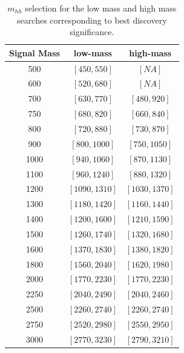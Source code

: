 \begin{table}
\label{tab:mhh_sig_cuts}
\begin{center}
\begin{tabular}{c|c|c}
  Signal Mass & low-mass & high-mass\\
\hline
500 & $[ 450, 550] $   & $[ NA ] $ \\
600 & $[ 520, 680] $ & $[ NA ] $\\ 
700 & $[ 630, 770] $ & $[ 480, 920 ] $\\ 
750 & $[ 680, 820] $ & $[ 660, 840] $\\ 
800 & $[ 720, 880] $ & $[ 730, 870] $\\ 
900 & $[ 800, 1000] $ & $[ 750, 1050] $\\ 
1000 & $[ 940, 1060] $ & $[ 870, 1130] $\\ 
1100 & $[ 960, 1240] $ & $[ 880, 1320] $\\ 
1200 & $[ 1090, 1310] $ & $[ 1030, 1370] $\\ 
1300 & $[ 1180, 1420] $ & $[ 1160, 1440] $\\ 
1400 & $[ 1200, 1600] $ & $[ 1210, 1590] $\\ 
1500 & $[ 1260, 1740] $ & $[ 1320, 1680] $\\ 
1600 & $[ 1370, 1830] $ & $[ 1380, 1820] $\\ 
1800 & $[ 1560, 2040] $ & $[ 1620, 1980] $\\ 
2000 & $[ 1770, 2230] $ & $[ 1770, 2230] $\\ 
2250 & $[ 2040, 2490] $ & $[ 2040, 2460] $\\ 
2500 & $[ 2260, 2740] $ & $[ 2260, 2740] $\\ 
2750 & $[ 2520, 2980] $ & $[ 2550, 2950] $\\ 
3000 & $[ 2770, 3230] $ & $[ 2790, 3210] $\\  
\hline
\end{tabular}
\end{center}
\caption{$m_{hh}$ selection for the low mass and high mass searches corresponding to best discovery significance.} 
\end{table}
